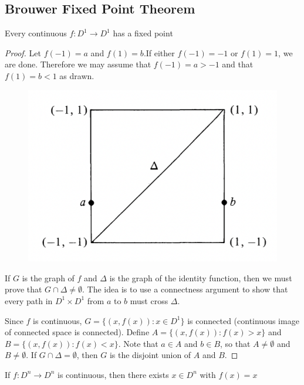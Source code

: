 \documentclass[11pt]{article}
\begin{document}
\subsection{Brouwer Fixed Point Theorem}
\label{sec:orgd27fa8f}
\begin{theorem}[]
Every continuous \(f:D^1\to D^1\) has a fixed point
\end{theorem}

\begin{proof}
Let \(f(-1)=a\) and \(f(1)=b\).If either \(f(-1)=-1\) or \(f(1)=1\), we are done. Therefore we
may assume that \(f(-1)=a>-1\) and that \(f(1)=b<1\) as drawn.
\begin{figure}[htbp]
\centering
\includegraphics[width=.5\textwidth]{../images/AnIntroductionToAlgebraicTopology/1.png}
\label{}
\end{figure}
If \(G\) is the graph of \(f\) and \(\Delta\) is the graph of the identity function, then we must prove
that \(G\cap\Delta\neq\emptyset\). The idea is to use a connectness argument to show that every path in \(D^1\times D^1\)
from \(a\) to \(b\) must cross \(\Delta\).

Since \(f\) is continuous, \(G=\{(x,f(x)):x\in D^1\}\) is connected (continuous image of connected
space is connected). Define \(A=\{(x,f(x)):f(x)>x\}\)  and \(B=\{(x,f(x)):f(x)<x\}\). Note
that \(a\in A\) and \(b\in B\), so that \(A\neq\emptyset\) and \(B\neq\emptyset\). If \(G\cap\Delta=\emptyset\), then \(G\) is the disjoint
union of \(A\) and \(B\).
\end{proof}


\begin{theorem}
If \(f:D^n\to D^n\) is continuous, then there exists \(x\in D^n\) with \(f(x)=x\)
\end{theorem}
\end{document}
